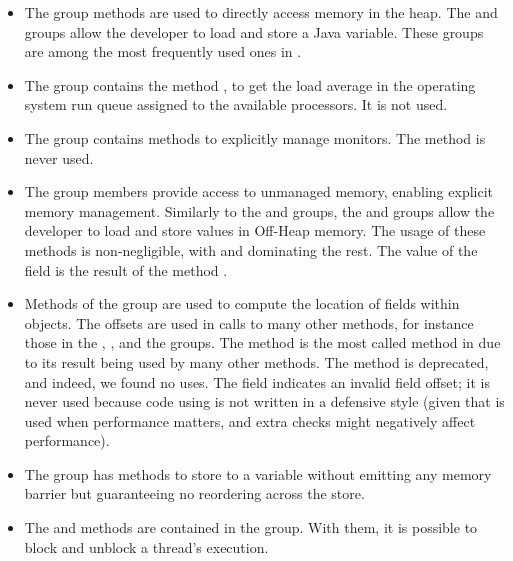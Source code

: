 \begin{itemize}
\item The  group methods are used to directly access memory in the \java{} heap. The  and  groups allow the developer to load and store a Java variable. These groups are among the most frequently used ones in \unsafe{}.

\item The  group contains the method , to get the load average in the operating system run queue assigned to the available processors. It is not used.

\item The  group contains methods to explicitly manage \java{} monitors.
The  method is never used.

\item The  group members provide access to unmanaged memory,
enabling explicit memory management.
Similarly to the  and  groups,
the  and  groups allow the developer to load and store values in Off-Heap memory.
The usage of these methods is non-negligible,
with  and  dominating the rest.
The value of the  field is the result of the method .

\item Methods of the  group are used to compute the location of fields within \java{} objects.
The offsets are used in calls to many other \smu{} methods,
for instance those in the , , and the  groups.
The method  is the most called method in \smu{} due to its result being used by many other \smu{} methods.
The  method is deprecated,
and indeed, we found no uses.
The  field indicates an invalid field offset;
it is never used because code using  is not written in a defensive style
(given that \unsafe{} is used when performance matters,
and extra checks might negatively affect performance).

\item The  group has methods to store to a \java{} variable without emitting any memory barrier but guaranteeing no reordering across the store.

\item The  and  methods are contained in the  group. With them, it is possible to block and unblock a thread's execution.


\end{itemize}
